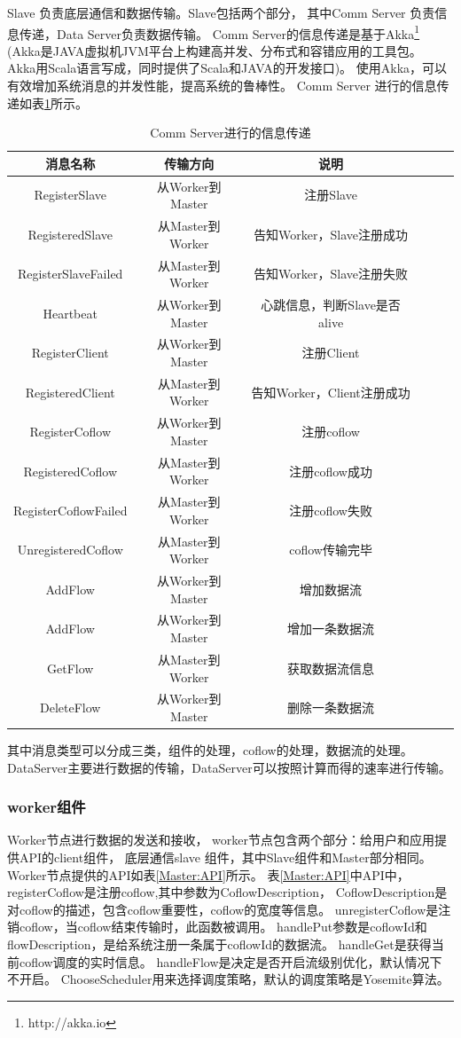 Slave 负责底层通信和数据传输。Slave包括两个部分，
其中Comm Server 负责信息传递，Data Server负责数据传输。
Comm Server的信息传递是基于Akka\footnote{http://akka.io}
(Akka是JAVA虚拟机JVM平台上构建高并发、分布式和容错应用的工具包。
Akka用Scala语言写成，同时提供了Scala和JAVA的开发接口)。
使用Akka，可以有效增加系统消息的并发性能，提高系统的鲁棒性。
Comm Server 进行的信息传递如表\ref{Master:CommServer}所示。
\begin{table}[h]
\centering
\footnotesize
 \caption{Comm Server进行的信息传递} \label{Master:CommServer}
\begin{tabular}{|c|c|c|c|c|c|} \hline
\toprule
消息名称  &传输方向&说明 \\
\toprule
RegisterSlave & 从Worker到Master&注册Slave\\
\toprule
RegisteredSlave & 从Master到Worker&告知Worker，Slave注册成功\\
\toprule
RegisterSlaveFailed & 从Master到Worker&告知Worker，Slave注册失败\\
\toprule
Heartbeat & 从Worker到Master&心跳信息，判断Slave是否alive\\
\toprule
RegisterClient & 从Worker到Master&注册Client\\
\toprule
RegisteredClient & 从Master到Worker&告知Worker，Client注册成功\\
\toprule
RegisterCoflow & 从Worker到Master&注册coflow\\
\toprule
RegisteredCoflow & 从Master到Worker&注册coflow成功\\
\toprule
RegisterCoflowFailed & 从Master到Worker&注册coflow失败\\
\toprule
UnregisteredCoflow & 从Master到Worker&coflow传输完毕\\
\toprule
AddFlow & 从Worker到Master&增加数据流\\
\toprule
AddFlow & 从Worker到Master&增加一条数据流\\
\toprule
GetFlow & 从Master到Worker&获取数据流信息\\
\toprule
DeleteFlow & 从Worker到Master&删除一条数据流\\
\toprule
\end{tabular}
\end{table}
其中消息类型可以分成三类，组件的处理，coflow的处理，数据流的处理。
DataServer主要进行数据的传输，DataServer可以按照计算而得的速率进行传输。


 \subsubsection{worker组件}
 Worker节点进行数据的发送和接收，
 worker节点包含两个部分：给用户和应用提供API的client组件，
 底层通信slave 组件，其中Slave组件和Master部分相同。
 Worker节点提供的API如表\ref{Master:API}所示。
表\ref{Master:API}中API中，registerCoflow是注册coflow,其中参数为CoflowDescription，
CoflowDescription是对coflow的描述，包含coflow重要性，coflow的宽度等信息。
unregisterCoflow是注销coflow，当coflow结束传输时，此函数被调用。
handlePut参数是coflowId和flowDescription，是给系统注册一条属于coflowId的数据流。
handleGet是获得当前coflow调度的实时信息。
handleFlow是决定是否开启流级别优化，默认情况下不开启。
ChooseScheduler用来选择调度策略，默认的调度策略是Yosemite算法。

